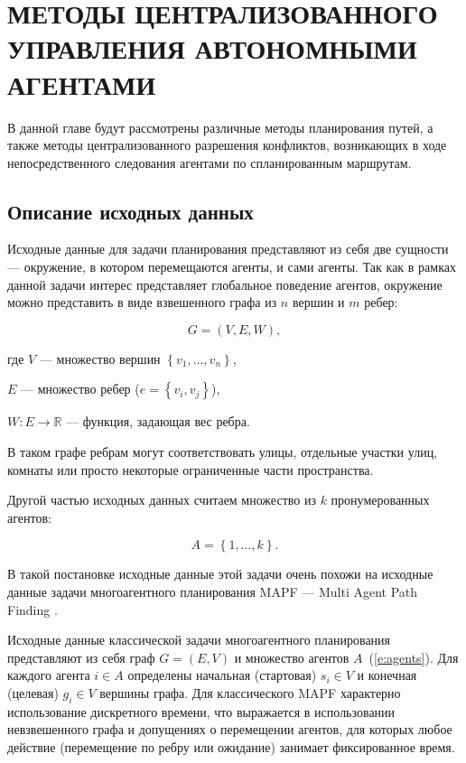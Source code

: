 \section{МЕТОДЫ ЦЕНТРАЛИЗОВАННОГО УПРАВЛЕНИЯ АВТОНОМНЫМИ АГЕНТАМИ}

В данной главе будут рассмотрены различные методы планирования путей, а также методы 
централизованного разрешения конфликтов, возникающих в ходе непосредственного следования агентами по 
спланированным маршрутам.

\subsection{Описание исходных данных}
Исходные данные для задачи планирования представляют из себя две сущности --- окружение, в котором 
перемещаются агенты, и сами агенты. Так как в рамках данной задачи интерес представляет глобальное
поведение агентов, окружение можно представить в виде взвешенного графа из $n$ вершин и $m$ ребер:

\begin{equation}
    G = (V, E, W),
\label{e:graph}
\end{equation}

где $V$ --- множество вершин $\left\{ v_1, \ldots, v_n \right\}$,\par
$E$ --- множество ребер ($e = \left\{ v_i, v_j \right\}$),\par
$W : E \rightarrow \mathbb{R}$ --- функция, задающая вес ребра.

В таком графе ребрам могут соответствовать улицы, отдельные участки улиц, комнаты или просто некоторые 
ограниченные части пространства.

Другой частью исходных данных считаем множество из $k$ пронумерованных агентов:

\begin{equation}
    A = \left\{ 1, \ldots, k \right\}.
\label{e:agents}
\end{equation}

В такой постановке исходные данные этой задачи очень похожи на исходные данные 
задачи многоагентного планирования MAPF --- Multi Agent Path Finding \cite{mapf-definition}.

Исходные данные классической задачи многоагентного планирования представляют из себя граф 
$G = (E, V)$ и множество агентов $A$~(\ref{e:agents}). Для каждого агента $i \in A$ определены 
начальная (стартовая) $s_i \in V$ и конечная (целевая) $g_i \in V$ вершины графа. Для классического 
MAPF характерно использование дискретного времени, что выражается в использовании невзвешенного графа
и допущениях о перемещении агентов, для которых любое действие (перемещение по ребру или ожидание) 
занимает фиксированное время.

